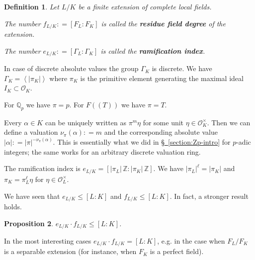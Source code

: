 \documentclass{article}
\newcommand{\term}{\textbf}
\newcommand{\dfn}{\mathrel{\mathop:}=}
\newcommand{\ZZ}{\mathbb{Z}}
\newcommand{\QQ}{\mathbb{Q}}
\newcommand{\refref}[2]{\hyperref[#2]{#1~\ref*{#2}}}
\newcommand{\examplesymbol}{$\blacktriangle$}
\renewcommand{\qedsymbol}{$\blacksquare$}
\theoremstyle{myplain}
\newtheorem{proposition}{Proposition}[section]
\theoremstyle{mydefinition}
\newtheorem{definition}[proposition]{Definition}
\newenvironment{example}
  {\pushQED{\qed}\renewcommand{\qedsymbol}{\examplesymbol}\examplex}
  {\popQED\endexamplex}
\begin{document}
\begin{definition}
  Let $L / K$ be a finite extension of complete local fields.

  The number $f_{L/K} \dfn [F_L : F_K]$ is called the \term{residue field
    degree} of the extension.

  The number $e_{L/K} \dfn [\Gamma_L : \Gamma_K]$ is called the
  \term{ramification index}.
\end{definition}

In case of discrete absolute values the group $\Gamma_K$ is discrete. We have
$\Gamma_K = \left< |\pi_K| \right>$ where $\pi_K$ is the primitive element
generating the maximal ideal $I_K \subset \mathcal{O}_K$.

\begin{example}
  For $\QQ_p$ we have $\pi = p$. For $F (\!(T)\!)$ we have $\pi = T$.
\end{example}

Every $\alpha \in K$ can be uniquely written as $\pi^m \eta$ for some unit
$\eta \in \mathcal{O}_K^\times$. Then we can define a valuation $\nu_\pi (\alpha) \dfn m$
and the corresponding absolute value $|\alpha| \dfn |\pi|^{-\nu_\pi
  (\alpha)}$. This is essentially what we did in \refref{\S}{section:Zp-intro}
for $p$-adic integers; the same works for an arbitrary discrete valuation ring.

The ramification index is $e_{L/K} = [|\pi_L|\,\ZZ : |\pi_K|\,\ZZ]$. We have
$|\pi_L|^\ell = |\pi_K|$ and $\pi_K = \pi_L^\ell \eta$ for
$\eta \in \mathcal{O}_L^\times$.

\vspace{1em}

We have seen that $e_{L/K} \le [L : K]$ and $f_{L/K} \le [L : K]$. In fact,
a stronger result holds.

\begin{proposition}
  $e_{L/K} \cdot f_{L/K} \le [L : K]$.
\end{proposition}

In the most interesting cases $e_{L/K} \cdot f_{L/K} = [L : K]$, e.g. in the
case when $F_L/F_K$ is a separable extension (for instance, when $F_K$ is a
perfect field).
\end{document}
